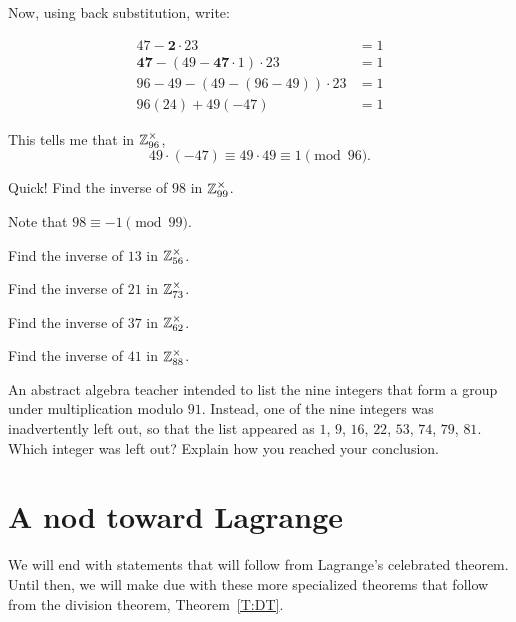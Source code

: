 \documentclass{ximera}
\begin{document}
Now, using back substitution, write:

\begin{align*}
47 - \boldsymbol{2}\cdot 23 &= 1 \\
\boldsymbol{47} - (49-\boldsymbol{47}\cdot 1)\cdot 23 &= 1 \\
96-49 - (49- (96-49))\cdot 23 &=1 \\
96(24) +49(-47) &=1
\end{align*}

This tells me that in $\mathbb Z_{96}^\times$,
\[
49\cdot (-47) \equiv 49\cdot 49 \equiv 1 \pmod{96}.
\]

\begin{exercise} %
  Quick! Find the inverse of $98$ in $\mathbb Z_{99}^\times$.
  \begin{hint}
    Note that $98 \equiv -1 \pmod{99}$.
  \end{hint}
\end{exercise}

\begin{exercise}
  Find the inverse of $13$ in $\mathbb Z_{56}^\times$.
\end{exercise}

\begin{exercise}
  Find the inverse of $21$ in $\mathbb Z_{73}^\times$.
\end{exercise}

\begin{exercise} %
  Find the inverse of $37$ in $\mathbb Z_{62}^\times$.
\end{exercise}

\begin{exercise} %
  Find the inverse of $41$ in $\mathbb Z_{88}^\times$.
\end{exercise}


\begin{exercise}
  An abstract algebra teacher intended to list the nine integers that
  form a group under multiplication modulo $91$. Instead, one of the
  nine integers was inadvertently left out, so that the list appeared
  as $1$, $9$, $16$, $22$, $53$, $74$, $79$, $81$. Which integer was
  left out? Explain how you reached your conclusion.
\end{exercise}



\section{A nod toward Lagrange}

We will end with statements that will follow from Lagrange's
celebrated theorem. Until then, we will make due with these more
specialized theorems that follow from the division theorem,
Theorem~\ref{T:DT}.
\end{document}
